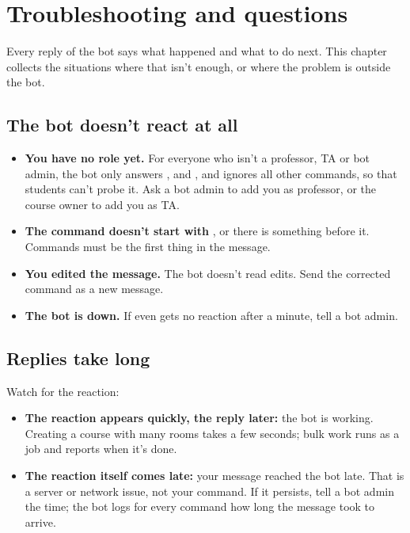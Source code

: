 \chapter{Troubleshooting and questions}
\label{ch:troubleshooting}

Every reply of the bot says what happened and what to do next. This chapter collects the
situations where that isn't enough, or where the problem is outside the bot.

\section{The bot doesn't react at all}
\label{sec:no-reply}

\begin{itemize}
  \item \textbf{You have no role yet.} For everyone who isn't a professor, TA or bot admin,
        the bot only answers ,  and , and
        ignores all other commands, so that students can't probe it. Ask a bot admin to add
        you as professor, or the course owner to add you as TA.
  \item \textbf{The command doesn't start with \cmd{!}}, or there is something before it.
        Commands must be the first thing in the message.
  \item \textbf{You edited the message.} The bot doesn't read edits. Send the corrected
        command as a new message.
  \item \textbf{The bot is down.} If even  gets no \robot{} reaction after a
        minute, tell a bot admin.
\end{itemize}

\section{Replies take long}
\label{sec:slow}

Watch for the \robot{} reaction:

\begin{itemize}
  \item \textbf{The reaction appears quickly, the reply later:} the bot is working. Creating a
        course with many rooms takes a few seconds; bulk work runs as a job and reports when
        it's done.
  \item \textbf{The reaction itself comes late:} your message reached the bot late. That is a
        server or network issue, not your command. If it persists, tell a bot admin the
        time; the bot logs for every command how long the message took to arrive.
\end{itemize}

